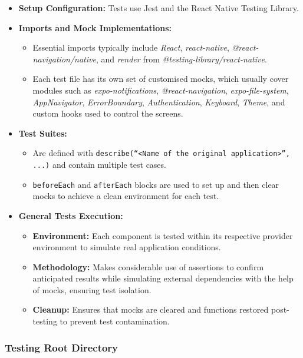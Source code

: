 \begin{itemize}
    \item \textbf{Setup Configuration:} Tests use Jest and the React Native Testing Library.
    \item \textbf{Imports and Mock Implementations:}
    \begin{itemize}
        \item Essential imports typically include \textit{React}, \textit{react-native}, \textit{@react-navigation/native}, and \textit{render} from \textit{@testing-library/react-native}.
        \item Each test file has its own set of customised mocks, which usually cover modules such as \textit{expo-notifications}, \textit{@react-navigation}, \textit{expo-file-system}, \textit{AppNavigator}, \textit{ErrorBoundary}, \textit{Authentication}, \textit{Keyboard}, \textit{Theme}, and custom hooks used to control the screens.
    \end{itemize}
    \item \textbf{Test Suites:}
    \begin{itemize}
        \item Are defined with \texttt{describe(``<Name of the original application>'', ...)} and contain multiple test cases.
        \item \texttt{beforeEach} and \texttt{afterEach} blocks are used to set up and then clear mocks to achieve a clean environment for each test.
    \end{itemize}
    \item \textbf{General Tests Execution:}
    \begin{itemize}
        \item \textbf{Environment:} Each component is tested within its respective provider environment to simulate real application conditions.
        \item \textbf{Methodology:} Makes considerable use of assertions to confirm anticipated results while simulating external dependencies with the help of mocks, ensuring test isolation.
        \item \textbf{Cleanup:} Ensures that mocks are cleared and functions restored post-testing to prevent test contamination.
    \end{itemize}
\end{itemize}

\subsubsection{Testing Root Directory}

